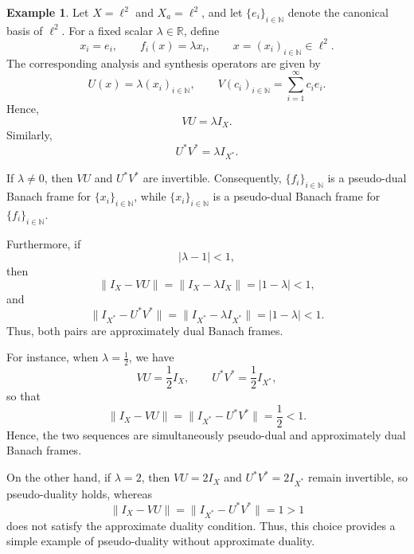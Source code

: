 \documentclass[12pt]{article}
\theoremstyle{definition}
\newtheorem{example}[theorem]{Example}
\theoremstyle{remark}
\begin{document}
\begin{example}
	Let \(X=\ell^2\) and \(X_a=\ell^2\), and let
	\(\{e_i\}_{i\in\mathbb{N}}\) denote the canonical basis of \(\ell^2\).
	For a fixed scalar \(\lambda\in\mathbb{R}\), define
	\[
	x_i=e_i,
	\qquad
	f_i(x)=\lambda x_i,
	\qquad
	x=(x_i)_{i\in\mathbb{N}}\in\ell^2.
	\]
	The corresponding analysis and synthesis operators are given by
	\[
	U(x)=\lambda(x_i)_{i\in\mathbb{N}},
	\qquad
	V(c_i)_{i\in\mathbb{N}}
	=\sum_{i=1}^{\infty}c_i e_i.
	\]
	Hence,
	\[
	VU=\lambda I_X.
	\]
	Similarly,
	\[
	U^*V^*=\lambda I_{X^*}.
	\]
	
	If \(\lambda\neq0\), then \(VU\) and \(U^*V^*\) are invertible.
	Consequently, \(\{f_i\}_{i\in\mathbb{N}}\) is a pseudo-dual Banach frame
	for \(\{x_i\}_{i\in\mathbb{N}}\), while
	\(\{x_i\}_{i\in\mathbb{N}}\) is a pseudo-dual Banach frame for
	\(\{f_i\}_{i\in\mathbb{N}}\).
	
	Furthermore, if
	\[
	|\lambda-1|<1,
	\]
	then
	\[
	\|I_X-VU\|
	=
	\|I_X-\lambda I_X\|
	=
	|1-\lambda|<1,
	\]
	and
	\[
	\|I_{X^*}-U^*V^*\|
	=
	\|I_{X^*}-\lambda I_{X^*}\|
	=
	|1-\lambda|<1.
	\]
	Thus, both pairs are approximately dual Banach frames.
	
	For instance, when \(\lambda=\frac12\), we have
	\[
	VU=\frac12 I_X,
	\qquad
	U^*V^*=\frac12 I_{X^*},
	\]
	so that
	\[
	\|I_X-VU\|
	=
	\|I_{X^*}-U^*V^*\|
	=
	\frac12<1.
	\]
	Hence, the two sequences are simultaneously pseudo-dual and
	approximately dual Banach frames.
	
	On the other hand, if \(\lambda=2\), then \(VU=2I_X\) and
	\(U^*V^*=2I_{X^*}\) remain invertible, so pseudo-duality holds, whereas
	\[
	\|I_X-VU\|
	=
	\|I_{X^*}-U^*V^*\|
	=1>1
	\]
	does not satisfy the approximate duality condition. Thus, this choice
	provides a simple example of pseudo-duality without approximate
	duality.
\end{example}
\end{document}

